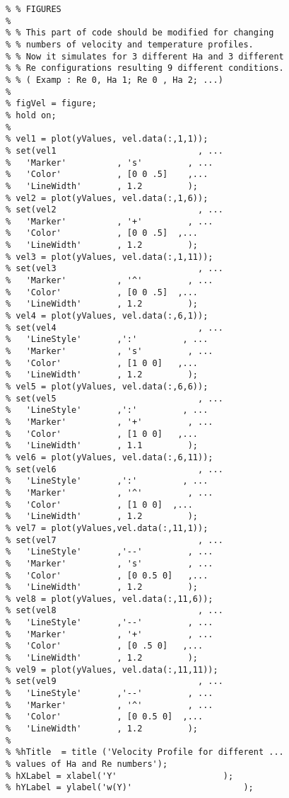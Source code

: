 \begin{lstlisting}
% % FIGURES
% 
% % This part of code should be modified for changing 
% % numbers of velocity and temperature profiles. 
% % Now it simulates for 3 different Ha and 3 different
% % Re configurations resulting 9 different conditions. 
% % ( Examp : Re 0, Ha 1; Re 0 , Ha 2; ...)
% 
% figVel = figure;
% hold on;
% 
% vel1 = plot(yValues, vel.data(:,1,1));
% set(vel1                            , ...
%   'Marker'          , 's'         , ...
%   'Color'           , [0 0 .5]    ,...
%   'LineWidth'       , 1.2         );
% vel2 = plot(yValues, vel.data(:,1,6));
% set(vel2                            , ...
%   'Marker'          , '+'         , ...
%   'Color'           , [0 0 .5]  ,...
%   'LineWidth'       , 1.2         );
% vel3 = plot(yValues, vel.data(:,1,11));
% set(vel3                            , ...
%   'Marker'          , '^'         , ...
%   'Color'           , [0 0 .5]  ,...
%   'LineWidth'       , 1.2         );
% vel4 = plot(yValues, vel.data(:,6,1));
% set(vel4                            , ...
%   'LineStyle'       ,':'         , ...
%   'Marker'          , 's'         , ...
%   'Color'           , [1 0 0]   ,...
%   'LineWidth'       , 1.2         );
% vel5 = plot(yValues, vel.data(:,6,6));
% set(vel5                            , ...
%   'LineStyle'       ,':'         , ...
%   'Marker'          , '+'         , ...
%   'Color'           , [1 0 0]   ,...
%   'LineWidth'       , 1.1         );
% vel6 = plot(yValues, vel.data(:,6,11));
% set(vel6                            , ...
%   'LineStyle'       ,':'         , ...
%   'Marker'          , '^'         , ...
%   'Color'           , [1 0 0]  ,...
%   'LineWidth'       , 1.2         );
% vel7 = plot(yValues,vel.data(:,11,1));
% set(vel7                            , ...
%   'LineStyle'       ,'--'         , ...
%   'Marker'          , 's'         , ...
%   'Color'           , [0 0.5 0]   ,...
%   'LineWidth'       , 1.2         );
% vel8 = plot(yValues, vel.data(:,11,6));
% set(vel8                            , ...
%   'LineStyle'       ,'--'         , ...
%   'Marker'          , '+'         , ...
%   'Color'           , [0 .5 0]   ,...
%   'LineWidth'       , 1.2         );
% vel9 = plot(yValues, vel.data(:,11,11));
% set(vel9                            , ...
%   'LineStyle'       ,'--'         , ...
%   'Marker'          , '^'         , ...
%   'Color'           , [0 0.5 0]  ,...
%   'LineWidth'       , 1.2         );
% 
% %hTitle  = title ('Velocity Profile for different ...
% values of Ha and Re numbers');
% hXLabel = xlabel('Y'                     );
% hYLabel = ylabel('w(Y)'                      );

\end{lstlisting}

